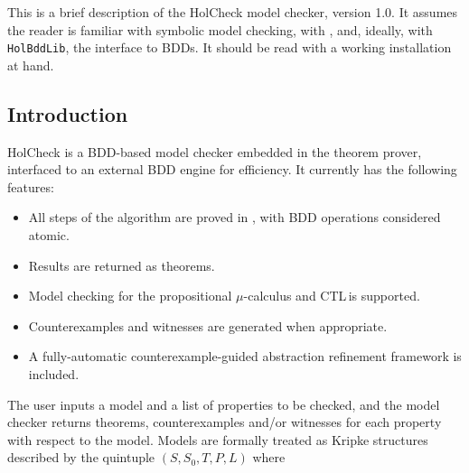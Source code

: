 \newcommand{\tsu}[1]{\textsf{\textup{#1}}}
\newcommand{\semb}[1]{\ensuremath{[\![#1]\!]}}
\newcommand{\rvset}{\ensuremath{V\!\!AR}}
\newcommand{\wff}{\ensuremath{w\!f\!\!f}}
\newcommand{\nnf}{\ensuremath{N\!N\!F\,}}
\newcommand{\ctl}{\textsf{CTL}\,}
\newcommand{\hc}{HolCheck}
\newcommand{\hand}{\texttt{/\char'134}}
\newcommand{\hor}{\texttt{\char'134/}}
\newcommand{\hnot}{\texttt{\~{}}}
\setcounter{sessioncount}{0}
This is a brief description of the \hc{}\index{holCheckLib!\hc{}} model checker, version 1.0. It assumes the reader is familiar with symbolic model checking, with \HOL{}, and, ideally, with \texttt{HolBddLib}, the \HOL{} interface to BDDs. It should be read with a working \HOL{} installation at hand.

\subsection{Introduction}\label{sec:intro}

\hc{} is a BDD-based model checker embedded in the \HOL{} theorem prover, interfaced to an external BDD engine for efficiency. It currently has the following features:

\begin{itemize}
\item All steps of the algorithm are proved in \HOL{}, with BDD operations considered atomic.
\item Results are returned as \HOL{} theorems.
\item Model checking for the propositional \(\mu\)-calculus and \ctl is supported.
\item Counterexamples and witnesses are generated when appropriate.
\item A fully-automatic counterexample-guided abstraction refinement framework is included.
\end{itemize}

The user inputs a model and a list of properties to be checked, and the model checker returns theorems, counterexamples and/or witnesses for each property with respect to the model. Models are formally treated as Kripke structures described by the quintuple \( (S, S_0, T, P, L) \) where

